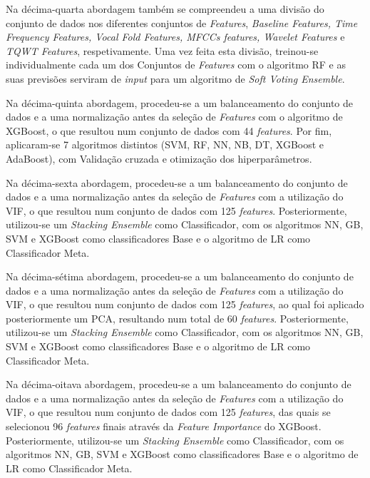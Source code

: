 \documentclass[12pt,a4paper,twoside]{report}
\begin{document}
{Na décima-quarta abordagem também se compreendeu a uma divisão do conjunto de dados nos diferentes conjuntos de \textit{Features}, \textit{Baseline Features, Time Frequency Features, Vocal Fold Features, MFCCs features, Wavelet Features} e \textit{TQWT Features}, respetivamente. Uma vez feita esta divisão, treinou-se individualmente cada um dos Conjuntos de \textit{Features} com o algoritmo \gls{RF} e as suas previsões serviram de \textit{input} para um algoritmo de \textit{Soft Voting Ensemble}.

Na décima-quinta abordagem, procedeu-se a um balanceamento do conjunto de dados e a uma normalização antes da seleção de \textit{Features} com o algoritmo de \gls{XGBoost}, o que resultou num conjunto de dados com 44 \textit{features}. Por fim, aplicaram-se 7 algoritmos distintos (\gls{SVM}, \Gls{RF}, \gls{NN}, \gls{NB}, \Gls{DT}, \Gls{XGBoost} e \gls{AdaBoost}), com Validação cruzada e otimização dos hiperparâmetros.

Na décima-sexta abordagem, procedeu-se a um balanceamento do conjunto de dados e a uma normalização antes da seleção de \textit{Features} com a utilização do \gls{VIF}, o que resultou num conjunto de dados com 125 \textit{features}. Posteriormente, utilizou-se um \textit{Stacking Ensemble} como Classificador, com os algoritmos \gls{NN}, \Gls{GB}, \gls{SVM} e \gls{XGBoost} como classificadores Base e o algoritmo de \gls{LR} como Classificador Meta.

Na décima-sétima abordagem, procedeu-se a um balanceamento do conjunto de dados e a uma normalização antes da seleção de \textit{Features} com a utilização do \gls{VIF}, o que resultou num conjunto de dados com 125 \textit{features}, ao qual foi aplicado posteriormente um \gls{PCA}, resultando num total de 60 \textit{features}. Posteriormente, utilizou-se um \textit{Stacking Ensemble} como Classificador, com os algoritmos \gls{NN}, \Gls{GB}, \gls{SVM} e \gls{XGBoost} como classificadores Base e o algoritmo de \gls{LR} como Classificador Meta.

Na décima-oitava abordagem, procedeu-se a um balanceamento do conjunto de dados e a uma normalização antes da seleção de \textit{Features} com a utilização do \gls{VIF}, o que resultou num conjunto de dados com 125 \textit{features}, das quais se selecionou 96 \textit{features} finais através da \textit{Feature Importance} do \gls{XGBoost}. Posteriormente, utilizou-se um \textit{Stacking Ensemble} como Classificador, com os algoritmos \gls{NN}, \Gls{GB}, \gls{SVM} e \gls{XGBoost} como classificadores Base e o algoritmo de \gls{LR} como Classificador Meta.

}
\end{document}
